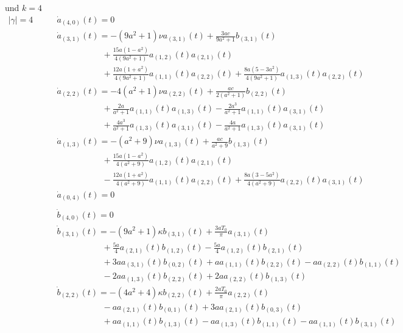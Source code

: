 und $k = 4$
\begin{align*}
|\gamma| = 4
\qquad &
\dot{a}_{(4,0)}(t) = 0
\\
&
\dot{a}_{(3,1)}(t)
=
-
(9 a^2+1)
\nu
a_{(3,1)}(t)
+
\frac{3 a c}{9 a^2+1} b_{(3,1)}(t)
\\
&\phantom{aaaaaaaaaa}
+
\frac{15 a (1 - a^2)}{4 (9 a^2+1)} a_{(1,2)}(t) a_{(2,1)}(t)
\\
&\phantom{aaaaaaaaaa}
+
\frac{12 a (1 + a^2)}{4 (9 a^2+1)} a_{(1,1)}(t) a_{(2,2)}(t)
+
\frac{8 a (5 - 3 a^2)}{4 (9 a^2+1)} a_{(1,3)}(t) a_{(2,2)}(t)
\\
&
\dot{a}_{(2,2)}(t)
=
-
4
(a^2+1)
\nu
a_{(2,2)}(t)
+
\frac{a c}{2 (a^2+1)} b_{(2,2)}(t)
\\
&\phantom{aaaaaaaaaa}
+
\frac{2 a}{a^2+1} a_{(1,1)}(t) a_{(1,3)}(t)
-
\frac{2 a^3}{a^2+1} a_{(1,1)}(t) a_{(3,1)}(t)
\\
&\phantom{aaaaaaaaaa}
+
\frac{4 a^3}{a^2+1} a_{(1,3)}(t) a_{(3,1)}(t)
-
\frac{4 a}{a^2+1} a_{(1,3)}(t) a_{(3,1)}(t)
\\
&
\dot{a}_{(1,3)}(t)
=
-
(a^2+9)
\nu
a_{(1,3)}(t)
+
\frac{a c}{a^2+9} b_{(1,3)}(t)
\\
&\phantom{aaaaaaaaaa}
+
\frac{15 a (1 - a^2)}{4 (a^2+9)} a_{(1,2)}(t) a_{(2,1)}(t)
\\
&\phantom{aaaaaaaaaa}
-
\frac{12 a (1 + a^2)}{4 (a^2+9)} a_{(1,1)}(t) a_{(2,2)}(t)
+
\frac{8 a (3 - 5 a^2)}{4 (a^2+9)} a_{(2,2)}(t) a_{(3,1)}(t)
\\
&
\dot{a}_{(0,4)}(t) = 0
\\
\\
&
\dot{b}_{(4,0)}(t) = 0
\\
&
\dot{b}_{(3,1)}(t)
=
-
(9 a^2+1)
\kappa
b_{(3,1)}(t)
+
\frac{3 a T_{0}}{\pi} a_{(3,1)}(t)
\\
&\phantom{aaaaaaaaaa}
+
\frac{5 a}{4} a_{(2,1)}(t) b_{(1,2)}(t)
-
\frac{5 a}{4} a_{(1,2)}(t) b_{(2,1)}(t)
\\
&\phantom{aaaaaaaaaa}
+
3 a
a_{(3,1)}(t) b_{(0,2)}(t)
+
a
a_{(1,1)}(t) b_{(2,2)}(t)
-
a
a_{(2,2)}(t) b_{(1,1)}(t)
\\
&\phantom{aaaaaaaaaa}
-
2 a
a_{(1,3)}(t) b_{(2,2)}(t)
+
2 a
a_{(2,2)}(t) b_{(1,3)}(t)
\\
&
\dot{b}_{(2,2)}(t)
=
-
(4 a^2+4)
\kappa
b_{(2,2)}(t)
+
\frac{2 a T_{0}}{\pi} a_{(2,2)}(t)
\\
&\phantom{aaaaaaaaaa}
-
a
a_{(2,1)}(t) b_{(0,1)}(t)
+
3 a
a_{(2,1)}(t) b_{(0,3)}(t)
\\
&\phantom{aaaaaaaaaa}
+
a
a_{(1,1)}(t) b_{(1,3)}(t)
-
a
a_{(1,3)}(t) b_{(1,1)}(t)
-
a
a_{(1,1)}(t) b_{(3,1)}(t)

\end{align*}
